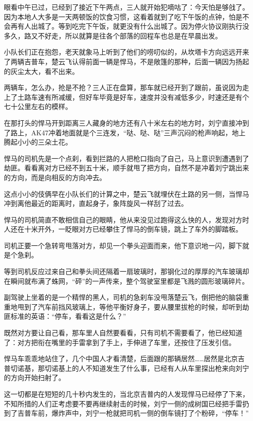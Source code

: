 眼看中午已过，已经到了接近下午两点，三人就开始犯嘀咕了：今天怕是够戗了。因为本地人大多是一天两顿饭的饮食习惯，这看着就到了吃下午饭的点钟，怕是不会再有人出城了。等到吃完下午饭，就更没有什么出城了。因为停火协议刚执行没多久，路又不好走，所以就算是往各个部落的回程车也总是在早晨出发。

小队长们正在抱怨，老天就象马上听到了他们的唠叨似的，从坎塔卡方向远远开来了两辆吉普车，楚云飞认得前面一辆是悍马，不是敞篷的那种，后面一辆因为扬起的灰尘太大，看不出来。

两辆车，怎么办，抢是不抢？三人正在盘算，那车就已经开到了跟前，虽说因为走上了土路车速有所减缓，但好车毕竟是好车，速度并没有减低多少，时速还是有个七十公里左右的模样。

在那打头的悍马开到距离三人藏身的地方还有八十米左右的地方时，刘宁直接冲到了路上，AK47冲着地面就是个三连发，“哒、哒、哒”三声沉闷的枪声响起，地上腾起小小的三朵土花。

悍马的司机先是一个点刹，看到拦路的人把枪口指向了自己，马上意识到遭遇到了劫匪。看看离对方已经不到五十米，顺手就甩了把方向，自然不是冲着刘宁跳出来的方向，而是向相反的方向冲去。

这点小小的伎俩早在小队长们的计算之中，楚云飞就埋伏在土路的另一侧，当悍马冲到离他最近的距离时，直起身子，象阵旋风一样刮了过去。

悍马的司机简直不敢相信自己的眼睛，他从来没见过跑得这么快的人，发现对方时人还在十米开外，一眨眼对方已经攀住了悍马的倒车镜，跳上了车外的脚踏板。

司机正要一个急转弯甩落对方，却见一个拳头迎面而来，他下意识地一闪，脚下就是个急刹。

等到司机反应过来自己和拳头间还隔着一扇玻璃时，那钢化过的厚厚的汽车玻璃却在瞬间就布满了蛛网，“砰”的一声传来，整个驾驶室里都是飞溅的圆形玻璃碎片。

副驾驶上坐着的是一个精悍的黑人，司机的急刹车没甩落楚云飞，倒把他的脑袋重重地甩到了汽车前挡风玻璃上，等他平衡好身子，要从腰里拔枪的时候，却听到劫匪标准的英语：“停车，看看这是什么？”

既然对方要让自己看，那车里人自然要看看，只有司机不需要看了，他已经知道了：对方把衔在嘴里的手雷拿到了手上，手伸进了车里，还按住了压发引信。

悍马车乖乖地站住了，几个中国人才看清楚，后面跟的那辆居然……居然是北京吉普切诺基，那切诺基上的人不知道发生了什么事，已经有人从车里探出枪来向刘宁的方向开始扫射了。

这一切都是在短短的几十秒内发生的，当北京吉普内的人发现悍马已经停了下来，不知所措的人们正考虑要不要再继续射击的时候，刘宁一侧的成树国已经把手雷扔到了吉普车前，爆炸声中，刘宁一枪就把司机一侧的倒车镜打了个粉碎，“停车！”

